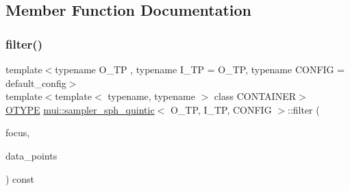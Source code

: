 \subsection{Member Function Documentation}
\mbox{\label{classmui_1_1sampler__sph__quintic_a5eb84f0e7f5d139116f0ba79ea5f2b4c}} 
\subsubsection{\texorpdfstring{filter()}{filter()}}
{\footnotesize\ttfamily template$<$typename O\+\_\+\+TP , typename I\+\_\+\+TP  = O\+\_\+\+TP, typename C\+O\+N\+F\+IG  = default\+\_\+config$>$ \\
template$<$template$<$ typename, typename $>$ class C\+O\+N\+T\+A\+I\+N\+ER$>$ \\
\hyperlink{classmui_1_1sampler__sph__quintic_ae24222e54f6ab4358ad5b89a14c7af3a}{O\+T\+Y\+PE} \hyperlink{classmui_1_1sampler__sph__quintic}{mui\+::sampler\+\_\+sph\+\_\+quintic}$<$ O\+\_\+\+TP, I\+\_\+\+TP, C\+O\+N\+F\+IG $>$\+::filter (\begin{DoxyParamCaption}\item[{\hyperlink{classmui_1_1sampler__sph__quintic_a81bf989d55a1247625c7783d9326d78b}{point\+\_\+type}}]{focus,  }\item[{const C\+O\+N\+T\+A\+I\+N\+ER$<$ \hyperlink{classmui_1_1sampler__sph__quintic_a3814b885ebc0a019391849f0cf976d7e}{I\+T\+Y\+PE}, C\+O\+N\+F\+IG $>$ \&}]{data\+\_\+points }\end{DoxyParamCaption}) const\hspace{0.3cm}{\ttfamily [inline]}}

\mbox{\label{classmui_1_1sampler__sph__quintic_ae7a2ca336d67f0311146356b23de2ec5}} 
